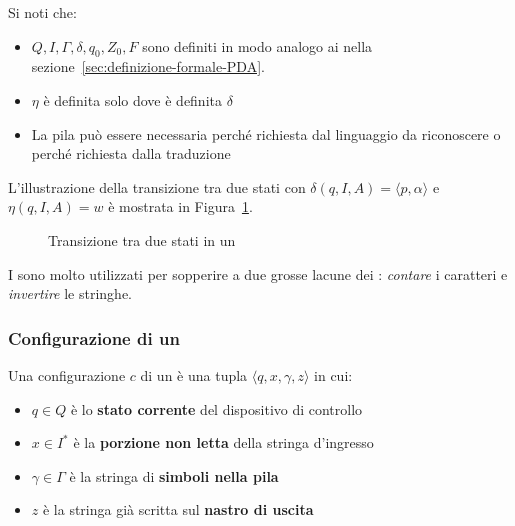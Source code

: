 \documentclass[italian, 10pt]{article}
\begin{document}
Si noti che:

\begin{itemize}
  \item \(Q, I, \Gamma, \delta, q_0, Z_0, F\) sono definiti in modo analogo ai \PDA nella sezione~\ref{sec:definizione-formale-PDA}.
  \item \(\eta\) è definita solo dove è definita \(\delta\)
  \item La pila può essere necessaria perché richiesta dal linguaggio da riconoscere o perché richiesta dalla traduzione
\end{itemize}

L'illustrazione della transizione tra due stati con \(\delta(q, I, A) = \langle p, \alpha \rangle\) e \(\eta(q, I, A) = w\) è mostrata in Figura~\ref{fig:transizione-stati-PDT}.

\begin{figure}[htbp]
  \bigskip
  \centering

  \caption{Transizione tra due stati in un \PDT}
  \label{fig:transizione-stati-PDT}
  \bigskip
\end{figure}

I \PDT sono molto utilizzati per sopperire a due grosse lacune dei \FST: \textit{contare} i caratteri e \textit{invertire} le stringhe.

\subsubsection{Configurazione di un \PDT}

Una configurazione \(c\) di un \PDT è una tupla \(\langle q, x, \gamma, z \rangle\) in cui:

\begin{itemize}
  \item \(q \in Q\) è lo \textbf{stato corrente} del dispositivo di controllo
  \item \(x \in I^\ast\) è la \textbf{porzione non letta} della stringa d'ingresso
  \item \(\gamma \in \Gamma\) è la stringa di \textbf{simboli nella pila}
  \item \(z\) è la stringa già scritta sul \textbf{nastro di uscita}
\end{itemize}
\end{document}
